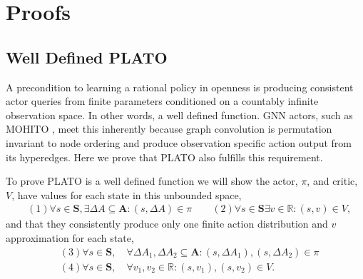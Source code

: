 

\section{Proofs}






\subsection{Well Defined PLATO}

A precondition to learning a rational policy in openness is producing consistent actor queries from finite parameters conditioned on a countably infinite observation space. In other words, a well defined function. GNN actors, such as MOHITO \citep{anilmohito}, meet this inherently because graph convolution is permutation invariant to node ordering and produce observation specific action output from its hyperedges. Here we prove that PLATO also fulfills this requirement.

To prove PLATO is a well defined function we will show the actor, $\pi$, and critic, $V$, have values for each state in this unbounded space,
$$
\begin{aligned}
    & (1) \forall s \in \mathbf{S}, \exists\Delta A \subseteq \mathbf{A}: (s,\Delta A) \in \pi
    \qquad (2) \forall s \in \mathbf{S} \exists v \in \mathbb{R}: (s,v) \in V,
\end{aligned}
$$
and that they consistently produce only one finite action distribution and $v$ approximation for each state,
$$
\begin{aligned}
    &(3) \forall s \in \mathbf{S}, \quad \forall \Delta A_1, \Delta A_2 \subseteq \mathbf{A}: (s,\Delta A_1), (s,\Delta A_2) \in \pi\\
    &(4) \forall s \in \mathbf{S}, \quad \forall v_1,  v_2 \in \mathbb{R}: (s,v_1), (s,v_2) \in V.
\end{aligned}
$$


